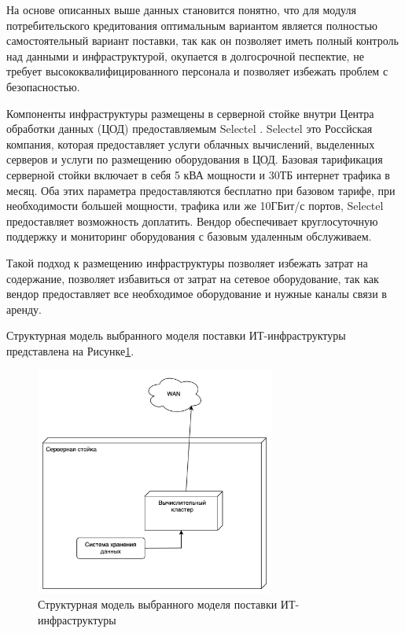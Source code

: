 \documentclass[14pt, a4paper]{extarticle}
\begin{document}
На основе описанных выше данных становится понятно, что для модуля потребительского кредитования
оптимальным вариантом является полностью самостоятельный вариант поставки, так как он позволяет
иметь полный контроль над данными и инфраструктурой, окупается в долгосрочной песпектие, не
требует высококвалифицированного персонала и позволяет избежать проблем с безопасностью.

Компоненты инфраструктуры размещены в серверной стойке внутри 
Центра обработки данных (ЦОД) предоставляемым Selectel \cite{selectel-web}.
Selectel это Россйская компания, которая предоставляет услуги облачных вычислений,
выделенных серверов и услуги по размещению оборудования в ЦОД. Базовая тарификация
серверной стойки включает в себя 5 кВА мощности и 30ТБ интернет трафика в месяц.
Оба этих параметра предоставляются бесплатно при базовом тарифе, при необходимости
большей мощности, трафика или же 10ГБит/с портов, Selectel предоставляет возможность 
доплатить. Вендор обеспечивает круглосуточную поддержку и мониторинг оборудования с 
базовым удаленным обслуживаем.

Такой подход к размещению инфраструктуры позволяет избежать затрат на содержание,
позволяет избавиться от затрат на сетевое оборудование, так как вендор предоставляет
все необходимое оборудование и нужные каналы связи в аренду. 

Структурная модель выбранного моделя поставки ИТ-инфраструктуры представлена на 
Рисунке\;\ref{fig:infra1}.

\begin{figure}[H]
  \centering
  \includegraphics[width=0.7\textwidth]{infra1_2.png}
  \caption{Структурная модель выбранного моделя поставки ИТ-инфраструктуры}
  \label{fig:infra1}
\end{figure}
\end{document}
